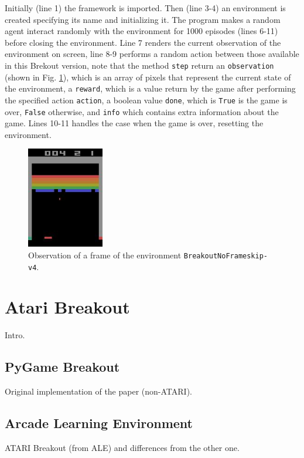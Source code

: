 \documentclass[a4paper]{article}
\begin{document}
Initially (line 1) the framework is imported. Then (line 3-4) an environment
is created specifying its name and initializing it. The program makes a
random agent interact randomly with the environment for 1000 episodes (lines
6-11) before closing the environment. Line 7 renders the current
observation of the environment on screen, line 8-9 performs a random action
between those available in this Brekout version, note that the method
\texttt{step} return an \texttt{observation} (shown in Fig.
\ref{fig:gym-breakout-image-example}), which is an array of pixels
that represent the current state of the environment, a \texttt{reward},
which is a value return by the game after performing the specified action
\texttt{action}, a boolean value \texttt{done}, which is \texttt{True} is
the game is over, \texttt{False} otherwise, and \texttt{info} which contains
extra information about the game. Lines 10-11 handles the case when the game
is over, resetting the environment.

\begin{figure}
    \centering
    \includegraphics[width=0.3\textwidth]{images/gym-breakout-image-example.jpg}
    \caption{Observation of a frame of the environment
        \texttt{BreakoutNoFrameskip-v4}.}
    \label{fig:gym-breakout-image-example}
\end{figure}

\clearpage
\section{Atari Breakout}
Intro.

\subsection{PyGame Breakout}
Original implementation of the paper (non-ATARI).

\subsection{Arcade Learning Environment}
ATARI Breakout (from ALE) and differences from the other one.
\end{document}
